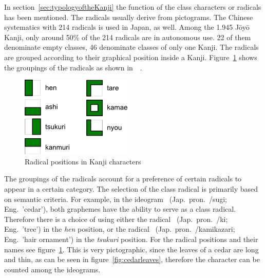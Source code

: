 In section~\ref{sec:typologyoftheKanji} the function of the class characters or
radicals has been mentioned. The radicals usually derive from pictograms. The
Chinese systematics with 214 radicals is used in Japan, as well. Among the 
1.945 Jōyō Kanji, only around 50\% of the 214 radicals are in autonomous use.
22 of them denominate empty classes, 46 denominate classes of only one Kanji.
The radicals are grouped according to their graphical position inside a Kanji.
Figure~\ref{fig:radicalPositions} shows the groupings of the radicals 
as shown in~~\citeyear{Foljanty1984}.
\begin{figure}[htbp]
\begin{center}
\includegraphics{images/radicalStructure/radicalPositions.png}
\caption{Radical positions in Kanji characters}
\label{fig:radicalPositions}
\end{center}
\end{figure}
The groupings of the radicals account for a preference of certain radicals
to appear in a certain category. The selection of the class radical is primarily
based on semantic criteria. For example, in the ideogram ~(Jap.\ pron.\ 
/sugi; Eng.\ 'cedar'), both graphemes have the ability to serve as a 
class radical. Therefore there is a choice of using either the radical 
\cjk{木}~(Jap.\ pron.\ \cjk{キ}/ki; Eng.\ 'tree') in the \emph{hen} position, 
or the radical \cjk{彡}~(Jap.\ pron.\ \cjk{カミカザリ}/kamikazari; 
Eng.\ 'hair ornament') in the \emph{tsukuri} position. For the radical positions
and their names see figure~\ref{fig:radicalPositions}. This is very pictographic,
since the leaves of a cedar are long and thin, 
as can be seen in figure~\ref{fig:cedarleaves}, 
therefore the character can be counted among the ideograms.
